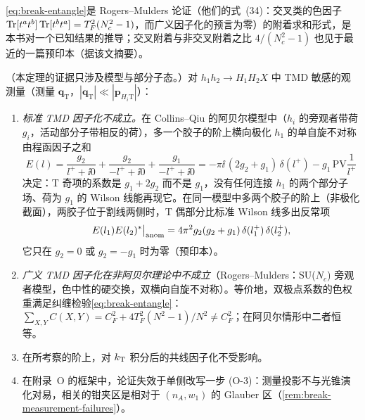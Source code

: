 \cref{eq:break-entangle}是 Rogers--Mulders 论证（他们的式~(34)：交叉类的色因子 $\operatorname{Tr}[t^at^b]\operatorname{Tr}[t^bt^a]=T_F^2(N_c^2-1)$，而广义因子化的预言为零）的附着求和形式，是本书对一个已知结果的推导；交叉附着与非交叉附着之比 $4/(N_c^2-1)$ 也见于最近的一篇预印本\cite{Zhou:2026ids}（据该文摘要）。

\begin{theorem}\label{thm:break-tmd}
（本定理的证据只涉及模型与部分子态。）对 $h_1h_2\to H_1H_2X$ 中 TMD 敏感的观测量（测量 $\boldsymbol q_{\mathrm T}$，$|\boldsymbol q_{\mathrm T}|\ll|\boldsymbol p_{H_i\mathrm T}|$）：
\begin{enumerate}[label=(\alph*),leftmargin=2.2em,itemsep=1pt,topsep=2pt]
\item \emph{标准 TMD 因子化不成立。}在 Collins--Qiu 的阿贝尔模型中（$h_i$ 的旁观者带荷 $g_i$，活动部分子带相反的荷），多一个胶子的阶上横向极化 $h_1$ 的单自旋不对称由程函因子之和
\begin{equation}\label{eq:break-El}
E(l)=\frac{g_2}{l^++\ii0}+\frac{g_2}{-l^++\ii0}+\frac{g_1}{-l^++\ii0}=-\pi\ii\,(2g_2+g_1)\,\delta(l^+)-g_1\,\mathrm{PV}\frac1{l^+}
\end{equation}
决定：T 奇项的系数是 $g_1+2g_2$ 而不是 $g_1$，没有任何连接 $h_1$ 的两个部分子场、荷为 $g_1$ 的 Wilson 线能再现它\cite{CollinsQiu2007}。在同一模型中多两个胶子的阶上（非极化截面），两胶子位于割线两侧时，T 偶部分比标准 Wilson 线多出反常项
\begin{equation}\label{eq:break-anomaly}
E(l_1)E(l_2)^*\big|_{\rm anom}=4\pi^2g_2(g_2+g_1)\,\delta(l_1^+)\,\delta(l_2^+),
\end{equation}
它只在 $g_2=0$ 或 $g_2=-g_1$ 时为零\cite{Collins2007}（预印本）。
\item \emph{广义 TMD 因子化在非阿贝尔理论中不成立}（Rogers--Mulders：SU($N_c$) 旁观者模型，色中性的硬交换，双横向自旋不对称\cite{RogersMulders2010}）。等价地，双极点系数的色权重满足纠缠检验\cref{eq:break-entangle}：$\sum_{X,Y}C(X,Y)=C_F^2+4T_F^2(N^2-1)/N^2\neq C_F^2$；在阿贝尔情形中二者恒等。
\item 在所考察的阶上，对 $k_{\mathrm{T}}$ 积分后的共线因子化不受影响\cite{Collins2007}。
\item 在附录~O 的框架中，论证失效于单侧改写一步 (O-3)：测量投影不与光锥演化对易，相关的钳夹区是相对于 $(n_A,w_1)$ 的 Glauber 区（\cref{rem:break-measurement-failures}）。
\end{enumerate}
\end{theorem}

